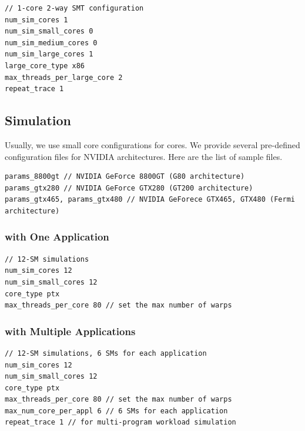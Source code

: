\begin{Verbatim}
// 1-core 2-way SMT configuration
num_sim_cores 1
num_sim_small_cores 0
num_sim_medium_cores 0
num_sim_large_cores 1
large_core_type x86
max_threads_per_large_core 2
repeat_trace 1
\end{Verbatim}



\subsection{\gpu Simulation}

Usually, we use small core configurations for \gpu cores. We provide
several pre-defined configuration files for NVIDIA architectures. Here
are the list of sample files.

\begin{Verbatim}
params_8800gt // NVIDIA GeForce 8800GT (G80 architecture)
params_gtx280 // NVIDIA GeForce GTX280 (GT200 architecture)
params_gtx465, params_gtx480 // NVIDIA GeForece GTX465, GTX480 (Fermi architecture)
\end{Verbatim}


\subsubsection{\gpu with One Application}

\begin{Verbatim}
// 12-SM simulations
num_sim_cores 12
num_sim_small_cores 12
core_type ptx
max_threads_per_core 80 // set the max number of warps 
\end{Verbatim}


\subsubsection{\gpu with Multiple Applications}

\begin{Verbatim}
// 12-SM simulations, 6 SMs for each application
num_sim_cores 12
num_sim_small_cores 12
core_type ptx
max_threads_per_core 80 // set the max number of warps 
max_num_core_per_appl 6 // 6 SMs for each application
repeat_trace 1 // for multi-program workload simulation
\end{Verbatim}


